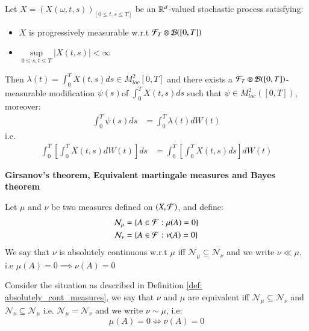 \begin{theorem}
\label{thm: Stochastic_Fubini}
Let $X = (X(\omega, t, s))_{[0\leq t,s\leq T]}$ be an $\mathbb{R}^{d}$-valued stochastic process satisfying: 
\begin{itemize}[leftmargin=*]
    \item $X$ is progressively measurable w.r.t $\mathcal{F}_{T}\otimes \mathcal{B}([0,T])$ 
    \item $\sup\limits_{0 \leq s,t\leq T}|{X(t,s)}| < \infty$
\end{itemize}
Then $\lambda(t) = \int_{0}^{T}X(t,s)ds \in M^{2}_{loc}[0,T]$ and there exists a $\mathcal{F}_{T}\otimes \mathcal{B}([0,T])$-measurable modification $\psi(s)$of $\int_{0}^{T}X(t,s)ds $ such that $\psi \in M^{2}_{loc}([0,T])$, moreover: 
\begin{align*}
\int_{0}^{T}\psi(s)ds &= \int_{0}^{T}\lambda(t)dW(t)    
\end{align*}
i.e. 
\begin{align*}
\int_{0}^{T}\left[
\int_{0}^{T}X(t,s)dW(t)
\right]ds 
&= 
\int_{0}^{T}\left[
\int_{0}^{T}X(t,s)ds
\right]dW(t) 
\end{align*}
\end{theorem}

\newpage 
\centerline{\textbf{Girsanov's theorem, Equivalent martingale measures and Bayes theorem}}

\begin{definition}
\label{def: absolutely_cont_measures}
Let $\mu$ and $\nu$ be two measures defined on $(X, \mathcal{F})$, and define: 
\begin{align*}
\mathcal{N}_{\mu} &= \{A \in \mathcal{F}: \mu(A) = 0\} \\ 
\mathcal{N}_{\nu} &= \{A \in \mathcal{F}: \nu(A) = 0\} 
\end{align*} 
We say that $\nu$ is absolutely continuous w.r.t $\mu$ iff $\mathcal{N}_{\mu} \subseteq \mathcal{N}_{\nu}$ and we write $\nu \ll \mu$, i.e $\mu(A) = 0 \implies \nu(A) = 0$
\end{definition}

\begin{definition}
Consider the situation as described in Definition \ref{def: absolutely_cont_measures}, we say that $\nu$ and $\mu$ are equivalent iff $\mathcal{N}_{\mu} \subseteq \mathcal{N}_{\nu}$ and 
$\mathcal{N}_{\nu} \subseteq \mathcal{N}_{\mu}$ i.e.  $\mathcal{N}_{\mu}= \mathcal{N}_{\nu}$
and we write $\nu \sim \mu$, i.e: 
$$
\mu(A) = 0 \iff \nu(A) = 0
$$
\end{definition}

